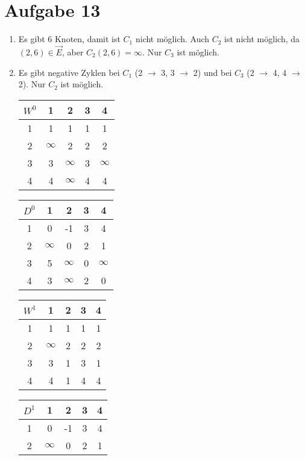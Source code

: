 \documentclass{article}
\begin{document}
	\section*{Aufgabe 13}
	\begin{enumerate}[label=(\alph*)]
		\item Es gibt 6 Knoten, damit ist $C_1$ nicht möglich. Auch $C_2$ ist nicht möglich, da $(2,6)\in\vec{E}$, aber $C_2(2,6)=\infty$. Nur $C_3$ ist möglich.
		\item Es gibt negative Zyklen bei $C_1$ (2 $\to$ 3, 3 $\to$ 2) und bei $C_3$ (2 $\to$ 4, 4 $\to$ 2). Nur $C_2$ ist möglich.
		\begin{center}
			\begin{tabular}{c|cccc}
				$W^0$ & 1 & 2 & 3 & 4 \\
				\hline
				1 & 1 & 1 & 1 & 1 \\
				2 & $\infty$ & 2 & 2 & 2 \\
				3 & 3 & $\infty$ & 3 & $\infty$ \\
				4 & 4 & $\infty$ & 4 & 4
			\end{tabular}
			\begin{tabular}{c|cccc}
				$D^0$ & 1 & 2 & 3 & 4 \\
				\hline
				1 & 0 & -1 & 3 & 4 \\
				2 & $\infty$ & 0 & 2 & 1 \\
				3 & 5 & $\infty$ & 0 & $\infty$ \\
				4 & 3 & $\infty$ & 2 & 0
			\end{tabular}
		\end{center}
		\begin{center}
			\begin{tabular}{c|cccc}
				$W^1$ & 1 & 2 & 3 & 4 \\
				\hline
				1 & \cellcolor{blue!20}1 & \cellcolor{blue!20}1 & \cellcolor{blue!20}1 & \cellcolor{blue!20}1 \\
				2 & \cellcolor{blue!20}$\infty$ & 2 & 2 & 2 \\
				3 & \cellcolor{blue!20}3 & 1 & 3 & 1 \\
				4 & \cellcolor{blue!20}4 & 1 & 4 & 4
			\end{tabular}
			\begin{tabular}{c|cccc}
				$D^1$ & 1 & 2 & 3 & 4 \\
				\hline
				1 & \cellcolor{blue!20}0 & \cellcolor{blue!20}-1 & \cellcolor{blue!20}3 & \cellcolor{blue!20}4 \\
				2 & \cellcolor{blue!20}$\infty$ & 0 & 2 & 1 \\

\end{tabular}
\end{center}
\end{enumerate}
\end{document}

